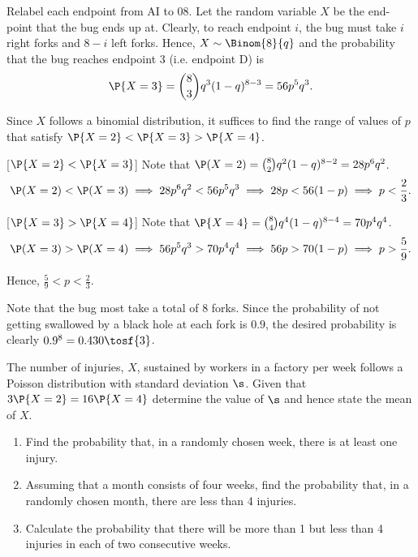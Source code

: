 \begin{solution}
    \begin{ppart}
        Relabel each endpoint from A{\textendash}I to 0{\textendash}8. Let the random variable $X$ be the end-point that the bug ends up at. Clearly, to reach endpoint $i$, the bug must take $i$ right forks and $8-i$ left forks. Hence, $X \sim \Binom{8}{q}$ and the probability that the bug reaches endpoint 3 (i.e. endpoint D) is \[\P{X = 3} = \binom{8}{3} q^3 (1-q)^{8-3} = 56p^5q^3.\]
    \end{ppart}
    \begin{ppart}
        Since $X$ follows a binomial distribution, it suffices to find the range of values of $p$ that satisfy $\P{X = 2} < \P{X = 3} > \P{X = 4}$.
        
        [$\P{X = 2} < \P{X = 3}$] Note that $\P(X = 2) = \binom{8}{2} q^2 (1-q)^{8-2} = 28p^6q^2$. \[\P(X = 2) < \P(X = 3) \implies 28p^6q^2 < 56p^5q^3 \implies 28p < 56(1-p) \implies p < \frac23.\]

        [$\P{X = 3} > \P{X = 4}$] Note that $\P{X = 4} = \binom{8}{4} q^4 (1 - q)^{8-4} = 70 p^4 q^4$. \[\P(X = 3) > \P(X = 4) \implies 56p^5q^3 > 70p^4q^4 \implies 56p > 70(1-p) \implies p > \frac59.\]

        Hence, $\frac59 < p < \frac23$.
    \end{ppart}
    \begin{ppart}
        Note that the bug most take a total of 8 forks. Since the probability of not getting swallowed by a black hole at each fork is $0.9$, the desired probability is clearly $0.9^8 = 0.430 \tosf{3}$.
    \end{ppart}
\end{solution}

\begin{problem}
    The number of injuries, $X$, sustained by workers in a factory per week follows a Poisson distribution with standard deviation $\s$. Given that $3\P{X = 2} = 16\P{X = 4}$ determine the value of $\s$ and hence state the mean of $X$.
    \begin{enumerate}
        \item Find the probability that, in a randomly chosen week, there is at least one injury.
        \item Assuming that a month consists of four weeks, find the probability that, in a randomly chosen month, there are less than 4 injuries.
        \item Calculate the probability that there will be more than 1 but less than 4 injuries in each of two consecutive weeks.
    \end{enumerate}
\end{problem}

